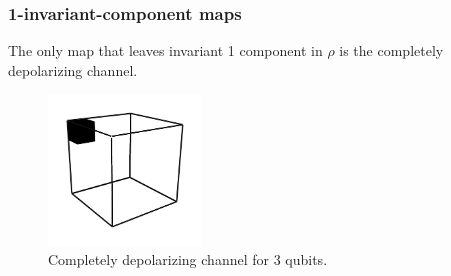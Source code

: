 \documentclass[11pt,dvipsnames]{article} %
\newcommand{\1}{\mathds{1}}
\begin{document}
\subsubsection*{1-invariant-component maps}
The only map that leaves invariant 1 component in $\rho$ is the completely
depolarizing channel.
\begin{figure}[H]
	\centering
	\includegraphics[height=4cm]{img/3q-1c}
	\caption{Completely depolarizing channel for 3 qubits.}
\end{figure}
\end{document}
